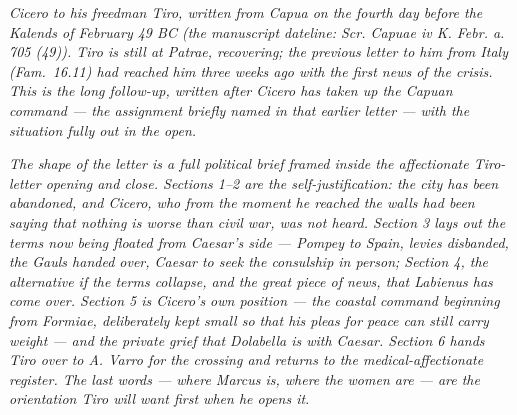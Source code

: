 
\textit{Cicero to his freedman Tiro, written from Capua
on the fourth day before the Kalends of February 49 BC
(the manuscript dateline: \textit{Scr. Capuae iv K.
Febr. a. 705 (49)}). Tiro is still at Patrae,
recovering; the previous letter to him from Italy
(\textit{Fam.}~16.11) had reached him three weeks ago
with the first news of the crisis. This is the long
follow-up, written after Cicero has taken up the
Capuan command --- the assignment briefly named in
that earlier letter --- with the situation fully out
in the open.}

\textit{The shape of the letter is a full political
brief framed inside the affectionate Tiro-letter
opening and close. Sections 1--2 are the
self-justification: the city has been abandoned, and
Cicero, who from the moment he reached the walls had
been saying that nothing is worse than civil war, was
not heard. Section 3 lays out the terms now being
floated from Caesar's side --- Pompey to Spain,
levies disbanded, the Gauls handed over, Caesar to
seek the consulship in person; Section 4, the
alternative if the terms collapse, and the great
piece of news, that Labienus has come over. Section 5
is Cicero's own position --- the coastal command
beginning from Formiae, deliberately kept small so
that his pleas for peace can still carry weight --- and
the private grief that Dolabella is with Caesar. Section
6 hands Tiro over to A. Varro for the crossing and
returns to the medical-affectionate register. The
last words --- where Marcus is, where the women are
--- are the orientation Tiro will want first when he
opens it.}
